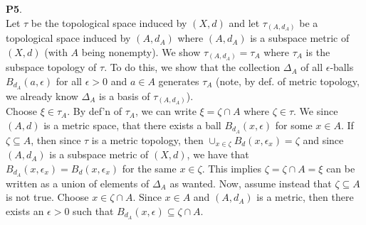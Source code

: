 \documentclass{article}
\begin{document}
    \textbf{P5}.\\
    Let $\tau$ be the topological space induced by $(X,d)$ and let $\tau_{(A,d_A)}$ be a topological space induced by $(A,d_A)$ where $(A,d_A)$ is a subspace metric of
    $(X,d)$ (with $A$ being nonempty). We show $\tau_{(A,d_A)} = \tau_A$ where $\tau_A$ is the subspace topology of $\tau$. To do this, we show that the collection
    $\Delta_A$ of all $\epsilon$-balls $B_{d_A}(a,\epsilon)$ for all $\epsilon>0$ and $a\in A$ generates $\tau_A$ (note, by def. of metric topology, we already know
    $\Delta_A$ is a basis of $\tau_{(A,d_A)}$).\\
    Choose $\xi\in\tau_A$. By def'n of $\tau_A$, we can write $\xi = \zeta\cap A$ where $\zeta\in\tau$. We since $(A,d)$ is a metric space, that there exists
    a ball $B_{d_A}(x,\epsilon)$ for some $x\in A$. If $\zeta\subseteq A$, then since $\tau$ is a metric topology, then $\cup_{x\in \zeta} B_d(x,\epsilon_x) = \zeta$
    and since $(A,d_A)$ is a subspace metric of $(X,d)$, we have that $B_{d_A}(x,\epsilon_x) = B_d(x,\epsilon_x)$ for the same $x\in\zeta$.
    This implies $\zeta = \zeta \cap A = \xi$ can be written as a union of elements of $\Delta_A$ as wanted. Now, assume instead that $\zeta\subseteq A$ is not true.
    Choose $x\in\zeta\cap A$. Since $x\in A$ and $(A,d_A)$ is a metric, then there exists an $\epsilon>0$ such that $B_{d_A}(x,\epsilon)\subseteq \zeta\cap A$.\\
\end{document}
